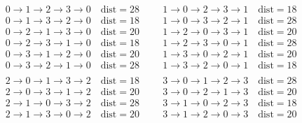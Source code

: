 \newpage
\appendix
	\begin{table}[h]
		\[
		\begin{split}
			&0 \rightarrow 1 \rightarrow 2 \rightarrow 3 \rightarrow 0 \quad \text{dist}=28 \hspace{1cm} 1 \rightarrow 0 \rightarrow 2 \rightarrow 3 \rightarrow 1 \quad \text{dist}=18 \\
			&0 \rightarrow 1 \rightarrow 3 \rightarrow 2 \rightarrow 0 \quad \text{dist}=18 \hspace{1cm} 1 \rightarrow 0 \rightarrow 3 \rightarrow 2 \rightarrow 1 \quad \text{dist}=28\\
			&0 \rightarrow 2 \rightarrow 1 \rightarrow 3 \rightarrow 0 \quad \text{dist}=20 \hspace{1cm} 1 \rightarrow 2 \rightarrow 0 \rightarrow 3 \rightarrow 1 \quad \text{dist}=20\\
			&0 \rightarrow 2 \rightarrow 3 \rightarrow 1 \rightarrow 0 \quad \text{dist}=18 \hspace{1cm} 1 \rightarrow 2 \rightarrow 3 \rightarrow 0 \rightarrow 1 \quad \text{dist}=28\\
			&0 \rightarrow 3 \rightarrow 1 \rightarrow 2 \rightarrow 0 \quad \text{dist}=20 \hspace{1cm} 1 \rightarrow 3 \rightarrow 0 \rightarrow 2 \rightarrow 1 \quad \text{dist}=20\\
			&0 \rightarrow 3 \rightarrow 2 \rightarrow 1 \rightarrow 0 \quad \text{dist}=28 \hspace{1cm} 1 \rightarrow 3 \rightarrow 2 \rightarrow 0 \rightarrow 1 \quad \text{dist}=18\\ \\
			&2 \rightarrow 0 \rightarrow 1 \rightarrow 3 \rightarrow 2 \quad \text{dist}=18 \hspace{1cm} 3 \rightarrow 0 \rightarrow 1 \rightarrow 2 \rightarrow 3 \quad \text{dist}=28 \\
			&2 \rightarrow 0 \rightarrow 3 \rightarrow 1 \rightarrow 2 \quad \text{dist}=20 \hspace{1cm} 3 \rightarrow 0 \rightarrow 2 \rightarrow 1 \rightarrow 3 \quad \text{dist}=20\\
			&2 \rightarrow 1 \rightarrow 0 \rightarrow 3 \rightarrow 2 \quad \text{dist}=28 \hspace{1cm} 3 \rightarrow 1 \rightarrow 0 \rightarrow 2 \rightarrow 3 \quad \text{dist}=18\\
			&2 \rightarrow 1 \rightarrow 3 \rightarrow 0 \rightarrow 2 \quad \text{dist}=20 \hspace{1cm} 3 \rightarrow 1 \rightarrow 2 \rightarrow 0 \rightarrow 3 \quad \text{dist}=20\\

\end{split}\]
\end{table}

